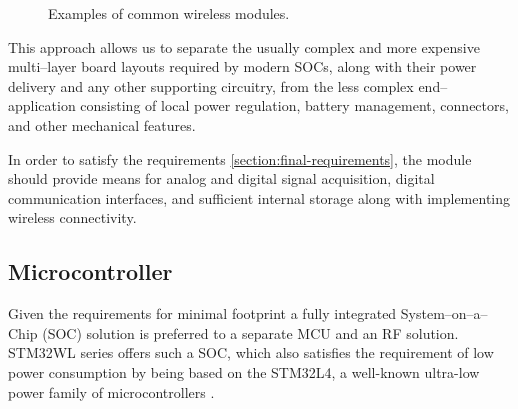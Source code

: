 \begin{figure}
    \centering
    \caption{\label{fig:wireless-modules}Examples of common wireless modules.}
\end{figure}

This approach allows us to separate the usually complex and more expensive multi--layer board layouts required by modern SOCs, along with their power delivery and any other supporting circuitry, from the less complex end--application consisting of local power regulation, battery management, connectors, and other mechanical features.

In order to satisfy the requirements \ref{section:final-requirements}, the module should provide means for analog and digital signal acquisition, digital communication interfaces, and sufficient internal storage along with implementing wireless connectivity.

\subsection{\label{section:mcu}Microcontroller}
Given the requirements for minimal footprint a fully integrated System--on--a--Chip (SOC) solution is preferred to a separate MCU and an RF solution. STM32WL series offers such a SOC, which also satisfies the requirement of low power consumption by being based on the STM32L4, a well-known ultra-low power family of microcontrollers \cite{stmicroelectronics_stm32wle5xx_nodate}.

